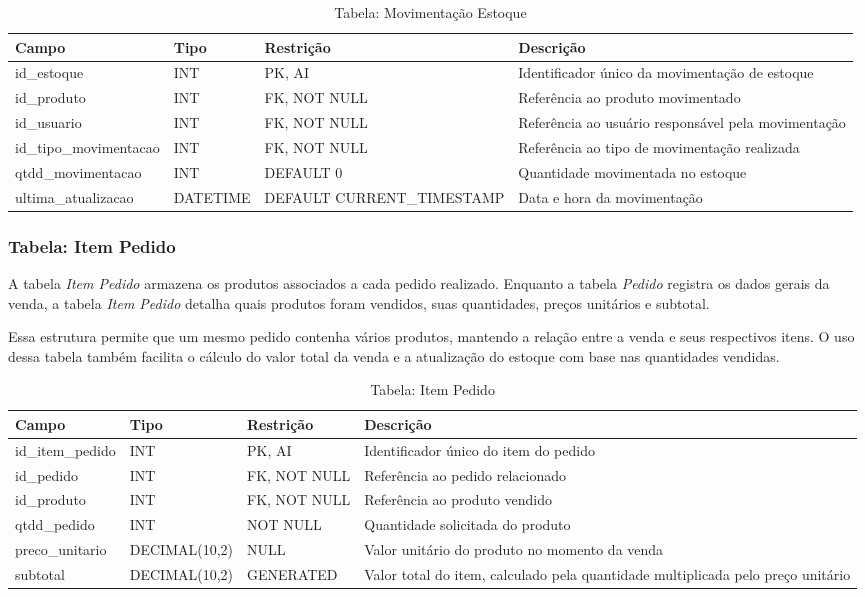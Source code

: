 \begin{table}[H]
\centering
\begin{tabular}{|p{3cm}|p{3cm}|p{3cm}|p{5cm}|}
\hline
\textbf{Campo} & \textbf{Tipo} & \textbf{Restrição} & \textbf{Descrição} \\ \hline
id\_estoque & INT & PK, AI & Identificador único da movimentação de estoque \\ \hline
id\_produto & INT & FK, NOT NULL & Referência ao produto movimentado \\ \hline
id\_usuario & INT & FK, NOT NULL & Referência ao usuário responsável pela movimentação \\ \hline
id\_tipo\_movimentacao & INT & FK, NOT NULL & Referência ao tipo de movimentação realizada \\ \hline
qtdd\_movimentacao & INT & DEFAULT 0 & Quantidade movimentada no estoque \\ \hline
ultima\_atualizacao & DATETIME & DEFAULT CURRENT\_TIMESTAMP & Data e hora da movimentação \\ \hline
\end{tabular}
\caption{Tabela: Movimentação Estoque}
\end{table}

\subsubsection{Tabela: Item Pedido}

A tabela \textit{Item Pedido} armazena os produtos associados a cada pedido realizado. Enquanto a tabela \textit{Pedido} registra os dados gerais da venda, a tabela \textit{Item Pedido} detalha quais produtos foram vendidos, suas quantidades, preços unitários e subtotal.

Essa estrutura permite que um mesmo pedido contenha vários produtos, mantendo a relação entre a venda e seus respectivos itens. O uso dessa tabela também facilita o cálculo do valor total da venda e a atualização do estoque com base nas quantidades vendidas.

\begin{table}[H]
\centering
\begin{tabular}{|p{3cm}|p{3cm}|p{3cm}|p{5cm}|}
\hline
\textbf{Campo} & \textbf{Tipo} & \textbf{Restrição} & \textbf{Descrição} \\ \hline
id\_item\_pedido & INT & PK, AI & Identificador único do item do pedido \\ \hline
id\_pedido & INT & FK, NOT NULL & Referência ao pedido relacionado \\ \hline
id\_produto & INT & FK, NOT NULL & Referência ao produto vendido \\ \hline
qtdd\_pedido & INT & NOT NULL & Quantidade solicitada do produto \\ \hline
preco\_unitario & DECIMAL(10,2) & NULL & Valor unitário do produto no momento da venda \\ \hline
subtotal & DECIMAL(10,2) & GENERATED & Valor total do item, calculado pela quantidade multiplicada pelo preço unitário \\ \hline
\end{tabular}
\caption{Tabela: Item Pedido}
\end{table}

